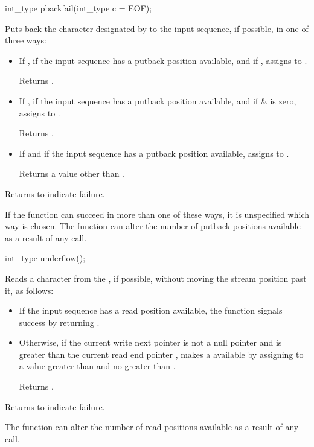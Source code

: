 %
\begin{itemdecl}
int_type pbackfail(int_type c = EOF);
\end{itemdecl}

\begin{itemdescr}
\pnum
Puts back the character designated by  to the input
sequence, if possible, in one of three ways:
\begin{itemize}
\item
If
,
if the input sequence has a putback position available, and if
,
assigns
to .

Returns .
\item
If
,
if the input sequence has a putback position available, and if
 \&  is zero,
assigns  to
.

Returns
.
\item
If
and if the input sequence has a putback position available,
assigns
to .

Returns a value other than
.
\end{itemize}

\pnum
Returns
to indicate failure.

\pnum
\remarks
If the function can succeed in more than one of these ways, it is
unspecified which way is chosen.
%
The function can alter the number of putback
positions available as a result of any call.
\end{itemdescr}

%
\begin{itemdecl}
int_type underflow();
\end{itemdecl}

\begin{itemdescr}
\pnum
\effects
Reads a character from the
,
if possible, without moving the stream position past it, as follows:
\begin{itemize}
\item
If the input sequence has a read position available, the function
signals success by returning
.
\item
Otherwise, if
the current write next pointer  is not a null pointer and
is greater than the current read end pointer ,
makes a
available by
assigning to  a value greater than  and
no greater than .

Returns .
\end{itemize}

\pnum
Returns
to indicate failure.

\pnum
\remarks
The function can alter the number of read positions available as a
result of any call.
\end{itemdescr}

